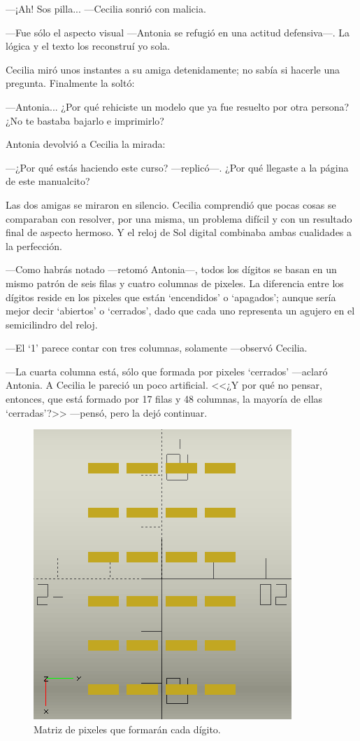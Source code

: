 ---¡Ah! Sos pilla... ---Cecilia sonrió con malicia.

---Fue sólo el aspecto visual ---Antonia se refugió en una
actitud defensiva---. La lógica y el texto los reconstruí
  yo sola.

Cecilia miró unos instantes a su amiga detenidamente; no sabía si
hacerle una pregunta. Finalmente la soltó:

---Antonia... ¿Por qué rehiciste un modelo que ya fue resuelto por
otra persona? ¿No te bastaba bajarlo e imprimirlo?

Antonia devolvió a Cecilia la mirada:

---¿Por qué estás haciendo este curso? ---replicó---. ¿Por qué
llegaste a la página \thepage{} de este manualcito?

Las dos amigas se miraron en silencio. Cecilia comprendió que pocas
cosas se comparaban con resolver, por una misma, un problema difícil y
con un resultado final de aspecto hermoso. Y el reloj de Sol digital
combinaba ambas cualidades a la perfección.

---Como habrás notado ---retomó Antonia---, todos los dígitos se basan
en un mismo patrón de seis filas y cuatro columnas de pixeles. La
diferencia entre los dígitos reside en los pixeles que están
`encendidos' o `apagados'; aunque sería mejor decir `abiertos' o
`cerrados', dado que cada uno representa un agujero en el semicilindro
del reloj.

---El `1' parece contar con tres columnas, solamente ---ob\-ser\-vó
Cecilia.

---La cuarta columna está, sólo que formada por pixeles `cerrados'
---aclaró Antonia. A Cecilia le pareció un poco artificial. <<¿Y por
qué no pensar, entonces, que está formado por 17 filas y 48 columnas,
la mayoría de ellas `cerradas'?>> ---pensó, pero la dejó continuar.

\begin{figure}[t]
  \centering
  \includegraphics[width=.35\textwidth]{imagenes/matriz}
  \caption{Matriz de pixeles que formarán cada dígito.}
  \label{fig:matriz}
\end{figure}

